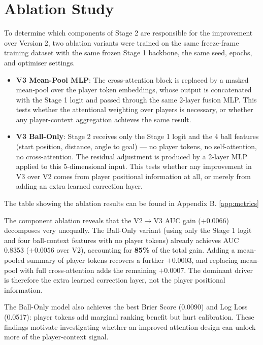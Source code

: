 \section{Ablation Study}\label{sec:v3_ablation}

To determine which components of Stage 2 are responsible for the improvement over Version 2, two ablation variants were trained on the same freeze-frame training dataset with the same frozen Stage 1 backbone, the same seed, epochs, and optimiser settings.

\begin{itemize}
    \item \textbf{V3 Mean-Pool MLP}: The cross-attention block is replaced by a masked mean-pool over the player token embeddings, whose output is concatenated with the Stage 1 logit and passed through the same 2-layer fusion MLP. This tests whether the attentional weighting over players is necessary, or whether any player-context aggregation achieves the same result.
    \item \textbf{V3 Ball-Only}: Stage 2 receives only the Stage 1 logit and the 4 ball features (start position, distance, angle to goal) — no player tokens, no self-attention, no cross-attention. The residual adjustment is produced by a 2-layer MLP applied to this 5-dimensional input. This tests whether any improvement in V3 over V2 comes from player positional information at all, or merely from adding an extra learned correction layer.
\end{itemize}

The table showing the ablation results can be found in Appendix B. \ref{app:metrics}

The component ablation reveals that the V2$\to$V3 AUC gain ($+0.0066$) decomposes very unequally. The Ball-Only variant (using only the Stage 1 logit and four ball-context features with no player tokens) already achieves AUC 0.8353 ($+0.0056$ over V2), accounting for \textbf{85\%} of the total gain. Adding a mean-pooled summary of player tokens recovers a further $+0.0003$, and replacing mean-pool with full cross-attention adds the remaining $+0.0007$. The dominant driver is therefore the extra learned correction layer, not the player positional information.

The Ball-Only model also achieves the best Brier Score (0.0090) and Log Loss (0.0517): player tokens add marginal ranking benefit but hurt calibration. These findings motivate investigating whether an improved attention design can unlock more of the player-context signal.

